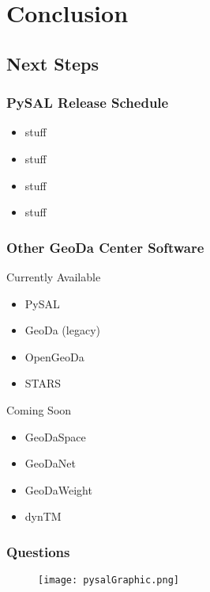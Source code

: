 \section{Conclusion} 

\subsection{Next Steps} 

\begin{frame}
	\frametitle{PySAL Release Schedule}
 \begin{itemize}
 \item stuff
 \item stuff
 \item stuff
 \item stuff
 \end{itemize}
 \end{frame} 

\begin{frame}
	\frametitle{Other GeoDa Center Software}
 
\begin{block}{Currently Available}
 \begin{itemize}
 \item PySAL
 \item GeoDa (legacy)
 \item OpenGeoDa
 \item STARS
 \end{itemize}
 \end{block} 
\begin{block}{Coming Soon}
 \begin{itemize}
 \item GeoDaSpace
 \item GeoDaNet
 \item GeoDaWeight
 \item dynTM
 \end{itemize}
 \end{block} \end{frame} 

\begin{frame}
	\frametitle{Questions}
  \begin{center}
 \begin{figure}[htbp]
 \texttt{[image: pysalGraphic.png]}
 \end{figure}
  {}\\
  {}
 \end{center}
 \end{frame} 



